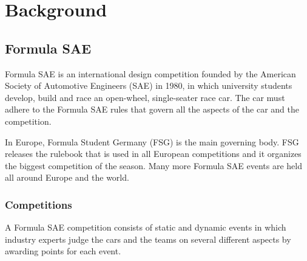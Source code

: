 \chapter{Background}

\section{Formula SAE}
Formula SAE is an international design competition founded by the American Society of Automotive Engineers (SAE) in 1980, in which university students develop, build and race an open-wheel, single-seater race car. The car must adhere to the Formula SAE rules that govern all the aspects of the car and the competition.

In Europe, Formula Student Germany (FSG) is the main governing body. FSG releases the rulebook \cite{fsg2020} that is used in all European competitions and it organizes the biggest competition of the season. Many more Formula SAE events are held all around Europe and the world.

\subsection{Competitions}
A Formula SAE competition consists of static and dynamic events in which industry experts judge the cars and the teams on several different aspects by awarding points for each event.


